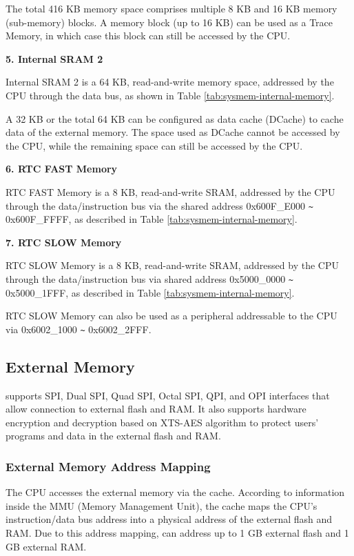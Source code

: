 \documentclass[main\_\_EN.tex]{subfiles}
\begin{document}
The total 416 KB memory space comprises multiple 8 KB and 16 KB memory (sub-memory) blocks. A memory block (up to 16 KB) can be used as a Trace Memory, in which case this block can still be accessed by the CPU.

{\bfseries 5. Internal SRAM 2}
\label{other:sysmem-internal-SRAM-2}

Internal SRAM 2 is a 64 KB, read-and-write memory space, addressed by the CPU through the data bus, as shown in Table \ref{tab:sysmem-internal-memory}.

A 32 KB or the total 64 KB can be configured as data cache (DCache) to cache data of the external memory. The space used as DCache cannot be accessed by the CPU, while the remaining space can still be accessed by the CPU.

{\bfseries 6. RTC FAST Memory}

RTC FAST Memory is a 8 KB, read-and-write SRAM, addressed by the CPU through the data/instruction bus via the shared address 0x{}600F\_E000 \verb+~+ 0x{}600F\_FFFF, as described in Table \ref{tab:sysmem-internal-memory}.

{\bfseries 7. RTC SLOW Memory}

RTC SLOW Memory is a 8 KB, read-and-write SRAM, addressed by the CPU through the data/instruction bus via shared address 0x{}5000\_0000 \verb+~+ 0x{}5000\_1FFF, as described in Table \ref{tab:sysmem-internal-memory}.

RTC SLOW Memory can also be used as a peripheral addressable to the CPU via 0x{}6002\_1000 \verb+~+ 0x{}6002\_2FFF.


\subsection{External Memory}
\label{para:sysmem-external-memory}

\chipname{} supports SPI, Dual SPI, Quad SPI, Octal SPI, QPI, and OPI interfaces that allow connection to external flash and RAM. It also supports hardware encryption and decryption based on XTS-AES algorithm to protect users' programs and data in the external flash and RAM.

\subsubsection{External Memory Address Mapping}

The CPU accesses the external memory via the cache. According to information inside the MMU (Memory Management Unit), the cache maps the CPU's instruction/data bus address into a physical address of the external flash and RAM. Due to this address mapping, \chipname{} can address up to 1 GB external flash and 1 GB external RAM.
\end{document}
